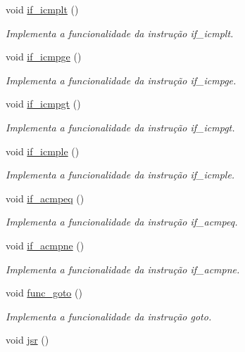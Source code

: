 \begin{DoxyCompactItemize}
void \hyperlink{classOperations_a06f624059cfada3f4a726d0482078aaa}{if\+\_\+icmplt} ()
\begin{DoxyCompactList}\small\item\em Implementa a funcionalidade da instrução if\+\_\+icmplt. \end{DoxyCompactList}\item 
void \hyperlink{classOperations_a147f088fabd19030a535ac68ff091be1}{if\+\_\+icmpge} ()
\begin{DoxyCompactList}\small\item\em Implementa a funcionalidade da instrução if\+\_\+icmpge. \end{DoxyCompactList}\item 
void \hyperlink{classOperations_a40232532d2522ef0afe261555688a7fd}{if\+\_\+icmpgt} ()
\begin{DoxyCompactList}\small\item\em Implementa a funcionalidade da instrução if\+\_\+icmpgt. \end{DoxyCompactList}\item 
void \hyperlink{classOperations_a7a5736e30fcd41a1bccb71c615c4e68d}{if\+\_\+icmple} ()
\begin{DoxyCompactList}\small\item\em Implementa a funcionalidade da instrução if\+\_\+icmple. \end{DoxyCompactList}\item 
void \hyperlink{classOperations_aa0432645b0d0effb4d4d839ea2dcec1c}{if\+\_\+acmpeq} ()
\begin{DoxyCompactList}\small\item\em Implementa a funcionalidade da instrução if\+\_\+acmpeq. \end{DoxyCompactList}\item 
void \hyperlink{classOperations_a7f43bbfba9b2feb66b695d24c43dc430}{if\+\_\+acmpne} ()
\begin{DoxyCompactList}\small\item\em Implementa a funcionalidade da instrução if\+\_\+acmpne. \end{DoxyCompactList}\item 
void \hyperlink{classOperations_aa4ae9d3899f61ee20ec278152891fe9e}{func\+\_\+goto} ()
\begin{DoxyCompactList}\small\item\em Implementa a funcionalidade da instrução goto. \end{DoxyCompactList}\item 
void \hyperlink{classOperations_a63c3ab8fef60a8a19ee336cb3d86f9aa}{jsr} ()

\end{DoxyCompactItemize}
